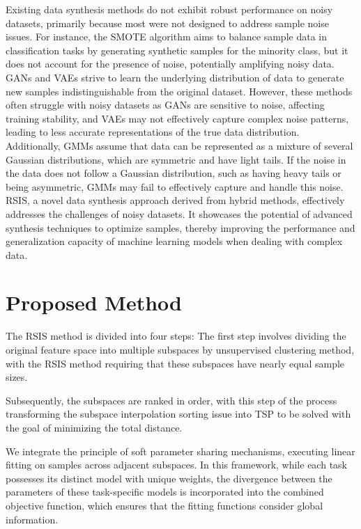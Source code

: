 \documentclass[final,3p,times]{elsarticle}
\begin{document}
Existing data synthesis methods do not exhibit robust performance 
on noisy datasets, primarily because most were not designed to 
address sample noise issues. {\color{myred}For instance, the SMOTE algorithm aims to balance sample data in classification tasks by generating synthetic samples for the minority class, but it does not account for the presence of noise, potentially amplifying noisy data. GANs and VAEs strive to learn the underlying distribution of data to generate new samples indistinguishable from the original dataset. However, these methods often struggle with noisy datasets as GANs are sensitive to noise, affecting training stability, and VAEs may not effectively capture complex noise patterns, leading to less accurate representations of the true data distribution. Additionally, GMMs assume that data can be represented as a mixture of several Gaussian distributions, which are symmetric and have light tails. If the noise in the data does not follow a Gaussian distribution, such as having heavy tails or being asymmetric, GMMs may fail to effectively capture and handle this noise.} RSIS, a 
novel data synthesis approach derived from hybrid methods, effectively addresses the challenges of noisy 
datasets. It showcases the potential of advanced synthesis techniques 
to optimize samples, thereby improving the performance and 
generalization capacity of machine learning models when dealing 
with complex data.






\section{Proposed Method}
The RSIS method is divided into four steps: The first step involves 
dividing the original feature space into multiple subspaces by 
unsupervised clustering method, with the RSIS method requiring 
that these subspaces have nearly equal sample sizes. 

Subsequently, the subspaces are ranked in order, with this step of 
the process transforming the subspace interpolation sorting issue 
into TSP to be solved with the goal of 
minimizing the total distance. 

We integrate the principle of soft parameter sharing mechanisms, 
executing linear fitting on samples across adjacent subspaces. In 
this framework, while each task possesses its distinct model with 
unique weights, the divergence between the parameters of these 
task-specific models is incorporated into the combined objective 
function, which ensures that the fitting functions consider 
global information.
\end{document}
